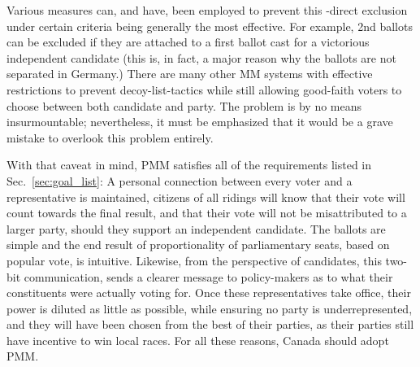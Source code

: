 Various measures can, and have, been employed to prevent this \--direct exclusion under certain criteria being generally the most effective.
For example, 2nd ballots can be excluded if they are attached to a first ballot cast for a victorious independent candidate (this is, in fact, a major reason why the ballots are not separated in Germany.)
There are many other MM systems with effective restrictions to prevent decoy-list-tactics while still allowing good-faith voters to choose between both candidate and party. The problem is by no means insurmountable; nevertheless, it must be emphasized that it would be a grave mistake to overlook this problem entirely.

With that caveat in mind, PMM satisfies all of the requirements listed in Sec.~\ref{sec:goal_list}: A personal connection between every voter and a representative is maintained, citizens of all ridings will know that their vote will count towards the final result, and that their vote will not be misattributed to a larger party, should they support an independent candidate.
The ballots are simple and the end result of proportionality of parliamentary seats, based on popular vote, is intuitive.
Likewise, from the perspective of candidates, this two-bit communication, sends a clearer message to policy-makers as to what their constituents were actually voting for.
Once these representatives take office, their power is diluted as little as possible, while ensuring no party is underrepresented, and they will have been chosen from the best of their parties, as their parties still have incentive to win local races.
For all these reasons, Canada should adopt PMM.
